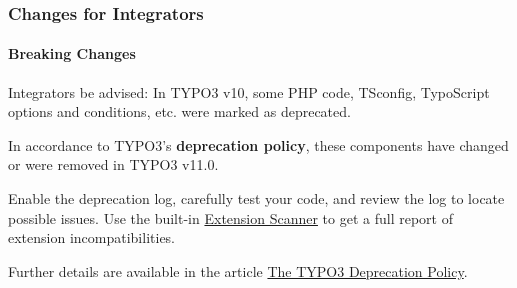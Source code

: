 %

\begin{frame}[fragile]
	\frametitle{Changes for Integrators}
	\framesubtitle{Breaking Changes}

	\small
		Integrators be advised: In TYPO3 v10, some PHP code, TSconfig, TypoScript
		options and conditions, etc. were marked as deprecated.

		\vspace{0.2cm}

		In accordance to TYPO3's \textbf{deprecation policy}, these components have
		changed or were removed in TYPO3 v11.0.

		\vspace{0.2cm}

		Enable the deprecation log, carefully test your code, and review the log
		to locate possible issues. Use the built-in
		\href{https://docs.typo3.org/m/typo3/reference-coreapi/master/en-us/ApiOverview/ExtensionScanner/Index.html}{Extension Scanner}
		to get a full report of extension incompatibilities.

		\vspace{0.2cm}

		Further details are available in the article
		\href{https://typo3.org/article/typo3-deprecation-policy}{The TYPO3 Deprecation Policy}.

	\normalsize

\end{frame}

